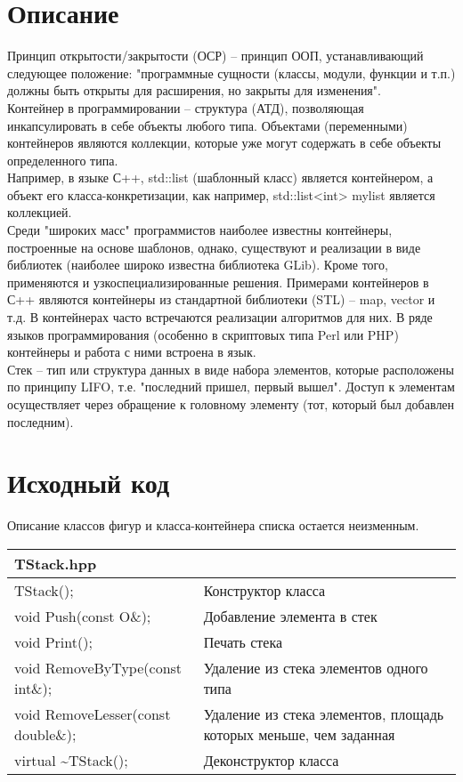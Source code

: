\section{Описание}

Принцип открытости/закрытости (ОСР) -- принцип ООП, устанавливающий следующее положение: "программные сущности (классы, модули, функции и т.п.) должны быть открыты для расширения, но закрыты для изменения". \\
Контейнер в программировании -- структура (АТД), позволяющая инкапсулировать в себе объекты любого типа. Объектами (переменными) контейнеров являются коллекции, которые уже могут содержать в себе объекты определенного типа. \\
Например, в языке С++, std::list (шаблонный класс) является контейнером, а объект его класса-конкретизации, как например, std::list<int> mylist является коллекцией. \\
Среди "широких масс" программистов наиболее известны контейнеры, построенные на основе шаблонов, однако, существуют и реализации в виде библиотек (наиболее широко известна библиотека GLib). Кроме того, применяются и узкоспециализированные решения. Примерами контейнеров в С++ являются контейнеры из стандартной библиотеки (STL) -- map, vector и т.д. В контейнерах часто встречаются реализации алгоритмов для них. В ряде языков программирования (особенно в скриптовых типа Perl или PHP) контейнеры и работа с ними встроена в язык. \\
Стек -- тип или структура данных в виде набора элементов, которые расположены по принципу LIFO, т.е. "последний пришел, первый вышел". Доступ к элементам осуществляет через обращение к головному элементу (тот, который был добавлен последним). \\

\section{Исходный код}

Описание классов фигур и класса-контейнера списка остается неизменным.\\

\begin{longtable}{|p{7.5cm}|p{7.5cm}|}
\rowcolor{lightgray}
\multicolumn{2}{|c|} {TStack.hpp}\\
\hline
TStack();&Конструктор класса\\
\hline
void Push(const O\&);&Добавление элемента в стек\\
\hline
void Print();&Печать стека\\
\hline
void RemoveByType(const int\&);&Удаление из стека элементов одного типа\\
\hline
void RemoveLesser(const double\&);&Удаление из стека элементов, площадь которых меньше, чем заданная\\
\hline
virtual \textasciitilde TStack();&Деконструктор класса\\
\hline
\end{longtable}

